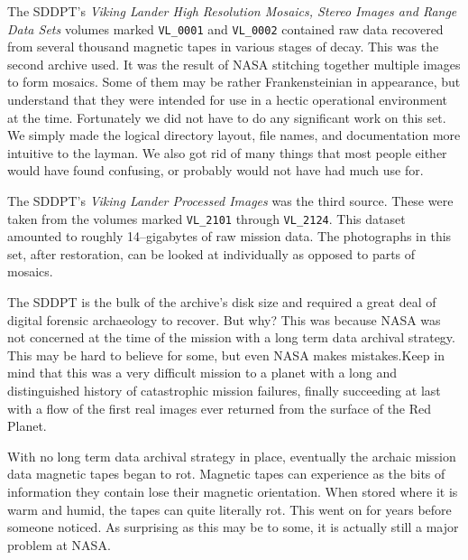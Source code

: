 The SDDPT's {\it Viking Lander High Resolution Mosaics, Stereo Images and Range Data Sets} volumes marked {\tt VL_0001} and {\tt VL_0002} contained raw data recovered from several thousand magnetic tapes in various stages of decay. This was the second archive used. It was the result of NASA stitching together multiple images to form mosaics. Some of them may be rather Frankensteinian in appearance, but understand that they were intended for use in a hectic operational environment at the time. Fortunately we did not have to do any significant work on this set. We simply made the logical directory layout, file names, and documentation more intuitive to the layman. We also got rid of many things that most people either would have found confusing, or probably would not have had much use for.

The SDDPT's {\it Viking Lander Processed Images} was the third source. These were taken from the volumes marked {\tt VL_2101} through {\tt VL_2124}. This dataset amounted to roughly 14--gigabytes of raw mission data. The photographs in this set, after restoration, can be looked at individually as opposed to parts of mosaics. 

The SDDPT is the bulk of the archive's disk size and required a great deal of digital forensic archaeology to recover. But why? This was because NASA was not concerned at the time of the mission with a long term data archival strategy. This may be hard to believe for some, but even NASA makes mistakes. Keep in mind that this was a very difficult mission to a planet with a long and distinguished history of catastrophic mission failures, finally succeeding at last with a flow of the first real images ever returned from the surface of the Red Planet.

    {}

With no long term data archival strategy in place, eventually the archaic mission data magnetic tapes began to rot. Magnetic tapes can experience  as the bits of information they contain lose their magnetic orientation. When stored where it is warm and humid, the tapes can quite literally rot. This went on for years before someone noticed. As surprising as this may be to some, it is actually still a major problem at NASA.

